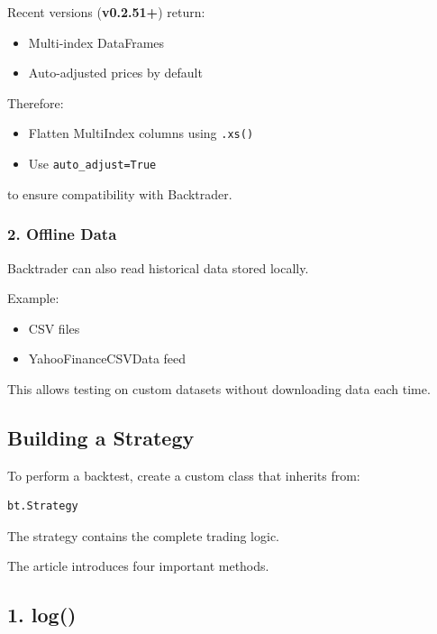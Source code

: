 \documentclass[12pt,openany]{book}
\begin{document}
Recent versions (\textbf{v0.2.51+}) return:

\begin{itemize}[leftmargin=*]
    \item Multi-index DataFrames
    \item Auto-adjusted prices by default
\end{itemize}

Therefore:

\begin{itemize}[leftmargin=*]
    \item Flatten MultiIndex columns using \texttt{.xs()}
    \item Use \texttt{auto\_adjust=True}
\end{itemize}

to ensure compatibility with Backtrader.

\subsubsection{2. Offline Data}

Backtrader can also read historical data stored locally.

Example:

\begin{itemize}[leftmargin=*]
    \item CSV files
    \item YahooFinanceCSVData feed
\end{itemize}

This allows testing on custom datasets without downloading data each time.

\subsection{Building a Strategy}

To perform a backtest, create a custom class that inherits from:

\begin{Verbatim}[breaklines=true,breakanywhere=true,fontsize=\small]
bt.Strategy
\end{Verbatim}

The strategy contains the complete trading logic.

The article introduces four important methods.

\subsection{1. log()}
\end{document}
